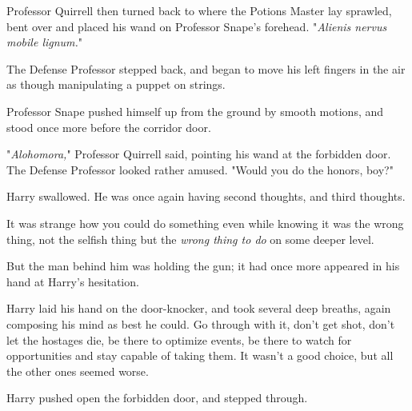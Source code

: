 Professor Quirrell then turned back to where the Potions Master lay sprawled,
bent over and placed his wand on Professor Snape's forehead. "\emph{Alienis
nervus mobile lignum.}"

The Defense Professor stepped back, and began to move his left fingers in the
air as though manipulating a puppet on strings.

Professor Snape pushed himself up from the ground by smooth motions, and stood
once more before the corridor door.

"\emph{Alohomora,}" Professor Quirrell said, pointing his wand at the forbidden
door. The Defense Professor looked rather amused. "Would you do the honors,
boy?"

Harry swallowed. He was once again having second thoughts, and third thoughts.

It was strange how you could do something even while knowing it was the wrong
thing, not the selfish thing but the \emph{wrong thing to do} on some deeper
level.

But the man behind him was holding the gun; it had once more appeared in his
hand at Harry's hesitation.

Harry laid his hand on the door-knocker, and took several deep breaths, again
composing his mind as best he could. Go through with it, don't get shot, don't
let the hostages die, be there to optimize events, be there to watch for
opportunities and stay capable of taking them. It wasn't a good choice, but all
the other ones seemed worse.

Harry pushed open the forbidden door, and stepped through.
